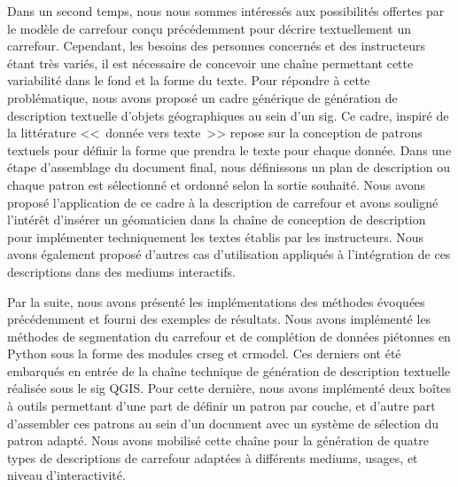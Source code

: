 \newpar{}


Dans un second temps, nous nous sommes intéressés aux possibilités offertes par le modèle de carrefour conçu précédemment pour décrire textuellement un carrefour. Cependant, les besoins des personnes concernés et des instructeurs étant très variés, il est nécessaire de concevoir une chaîne permettant cette variabilité dans le fond et la forme du texte. Pour répondre à cette problématique, nous avons proposé un cadre générique de génération de description textuelle d'objets géographiques au sein d'un \gls{sig}. Ce cadre, inspiré de la littérature <<~donnée vers texte~>> repose sur la conception de patrons textuels pour définir la forme que prendra le texte pour chaque donnée. Dans une étape d'assemblage du document final, nous définissons un plan de description ou chaque patron est sélectionné et ordonné selon la sortie souhaité. Nous avons proposé l'application de ce cadre à la description de carrefour et avons souligné l'intérêt d'insérer un géomaticien dans la chaîne de conception de description pour implémenter techniquement les textes établis par les instructeurs. Nous avons également proposé d'autres cas d'utilisation appliqués à l'intégration de ces descriptions dans des mediums interactifs.

\newpar{}


Par la suite, nous avons présenté les implémentations des méthodes évoquées précédemment et fourni des exemples de résultats. Nous avons implémenté les méthodes de segmentation du carrefour et de complétion de données piétonnes en Python sous la forme des modules crseg et crmodel. Ces derniers ont été embarqués en entrée de la chaîne technique de génération de description textuelle réalisée sous le \gls{sig} QGIS. Pour cette dernière, nous avons implémenté deux boîtes à outils permettant d'une part de définir un patron par couche, et d'autre part d'assembler ces patrons au sein d'un document avec un système de sélection du patron adapté. Nous avons mobilisé cette chaîne pour la génération de quatre types de descriptions de carrefour adaptées à différents mediums, usages, et niveau d'interactivité. 

\newpar{}

